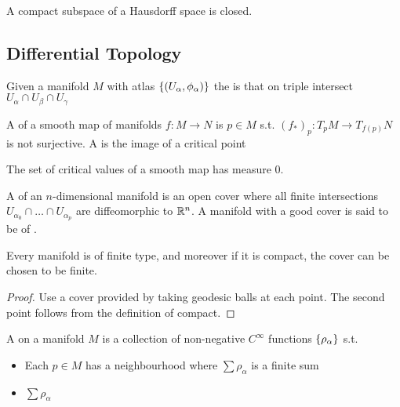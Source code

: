 \documentclass{article}
\begin{document}
\begin{prop}
	A compact subspace of a Hausdorff space is closed. 
\end{prop}

\subsection{Differential Topology}

\begin{definition}
	Given a manifold $M$ with atlas $\left\{ (U_\alpha,\phi_\alpha) \right\}$ the  is that on triple intersect $U_\alpha \cap U_\beta \cap U_\gamma$
\end{definition}

\begin{definition}
	A  of a smooth map of manifolds $f:M\to N$ is $p \in M$ s.t. $(f_\ast)_p:T_pM \to T_{f(p)}N$ is not surjective. A  is the image of a critical point
\end{definition}

\begin{theorem}[Sard]
	The set of critical values of a smooth map has measure 0.
\end{theorem}



\begin{definition}
	A  of an $n$-dimensional manifold is an open cover where all finite intersections $U_{\alpha_0} \cap \dots \cap U_{\alpha_p}$ are diffeomorphic to $\mathbb{R}^n$. A manifold with a good cover is said to be of . 
\end{definition}

\begin{theorem}
	Every manifold is of finite type, and moreover if it is compact, the cover can be chosen to be finite. 
\end{theorem}
\begin{proof}
	Use a cover provided by taking geodesic balls at each point. The second point follows from the definition of compact.
\end{proof}

\begin{definition}
	A  on a manifold $M$ is a collection of non-negative $C^\infty$ functions $\left\{ \rho_\alpha \right\}$ s.t. 
	\begin{itemize}
		\item Each $p \in M$ has a neighbourhood where $\sum \rho_\alpha$ is a finite sum
		\item $\sum \rho_\alpha$
	\end{itemize}
\end{definition}
\end{document}
